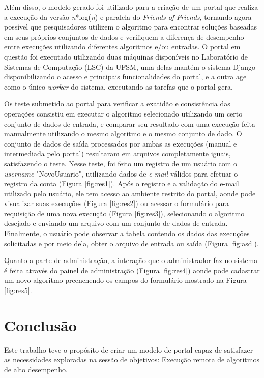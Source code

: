 \documentclass[tg]{mdtufsm}
\begin{document}
Além disso, o modelo gerado foi utilizado para a criação de um portal que realiza a execução da versão \emph{n}*log(\emph{n}) e paralela do \emph{Friends-of-Friends}, tornando agora possível que pesquisadores utilizem o algoritmo para encontrar soluções baseadas em seus próprios conjuntos de dados e verifiquem a diferença de desempenho entre execuções utilizando diferentes algoritmos e/ou entradas. O portal em questão foi executado utilizando duas máquinas disponíveis no Laboratório de Sistemas de Computação (LSC) da UFSM, uma delas mantém o sistema Django disponibilizando o acesso e principais funcionalidades do portal, e a outra age como o único \emph{worker} do sistema, executando as tarefas que o portal gera.

Os teste submetido ao portal para verificar a exatidão e consistência das operações consistiu em executar o algoritmo selecionado utilizando um certo conjunto de dados de entrada, e comparar seu resultado com uma execução feita manualmente utilizando o mesmo algoritmo e o mesmo conjunto de dado. O conjunto de dados de saída processados por ambas as execuções (manual e intermediada pelo portal) resultaram em arquivos completamente iguais, satisfazendo o teste. Nesse teste, foi feito um registro de um usuário com o \emph{username} "NovoUsuario", utilizando dados de \emph{e-mail} válidos para efetuar o registro da conta (Figura \ref{fig:res1}). Após o registro e a validação do e-mail utilizado pelo usuário, ele tem acesso ao ambiente restrito do portal, aonde pode visualizar suas execuções (Figura \ref{fig:res2}) ou acessar o formulário para requisição de uma nova execução (Figura \ref{fig:res3}), selecionando o algoritmo desejado e enviando um arquivo com um conjunto de dados de entrada. Finalmente, o usuário pode observar a tabela contendo os dados das execuções solicitadas e por meio dela, obter o arquivo de entrada ou saída (Figura \ref{fig:asd}).

Quanto a parte de administração, a interação que o administrador faz no sistema é feita através do painel de administração (Figura \ref{fig:res4}) aonde pode cadastrar um novo algoritmo preenchendo os campos do formulário mostrado na Figura \ref{fig:res5}.


\chapter{Conclusão}
Este trabalho teve o propósito de criar um modelo de portal capaz de satisfazer as necessidades exploradas na sessão de objetivos: Execução remota de algoritmos de alto desempenho.
\end{document}

